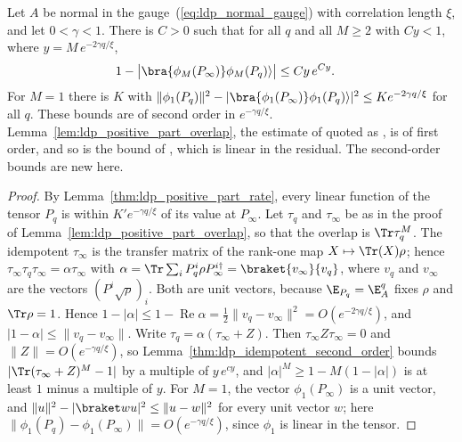 \begin{lemma}
    \label{thm:ldp_positive_part_overlap_second_order}
    \leanok
    Let $A$ be normal in the gauge~(\ref{eq:ldp_normal_gauge}) with correlation
    length $\xi$, and let $0<\gamma<1$. There is $C>0$ such that for all $q$ and
    all $M\ge2$ with $Cy<1$, where $y=M\,e^{-2\gamma q/\xi}$,
    \begin{align}
        1-\bigl\lvert\bra{\phi_M(P_\infty)}\phi_M(P_q)\rangle\bigr\rvert
         & \le Cy\,e^{Cy}.
        \notag
    \end{align}
    For $M=1$ there is $K$ with
    $\lVert\phi_1(P_q)\rVert^2
        -\lvert\bra{\phi_1(P_\infty)}\phi_1(P_q)\rangle\rvert^2\le Ke^{-2\gamma q/\xi}$
    for all $q$. These bounds are of second order in $e^{-\gamma q/\xi}$.
    Lemma~\ref{lem:ldp_positive_part_overlap}, the estimate of
    \cite{Piroli2021LOCC} quoted as \cite[eq.~(S9)]{Malz2024Preparation}, is
    of first order, and so is the
    bound of \cite[App.~B4, eq.~(S52)]{Murota2026ExactLogDepth}, which is
    linear in the residual. The second-order bounds are new here.
\end{lemma}
\begin{proof}
    \leanok
    By Lemma~\ref{thm:ldp_positive_part_rate}, every linear function of the
    tensor $P_q$ is within $K'e^{-\gamma q/\xi}$ of its value at $P_\infty$. Let
    $\tau_q$ and $\tau_\infty$ be as in the proof of
    Lemma~\ref{lem:ldp_positive_part_overlap}, so that the overlap is
    $\Tr\tau_q^M$. The idempotent $\tau_\infty$ is the transfer matrix of the
    rank-one map $X\mapsto\Tr(X)\rho$; hence $\tau_\infty\tau_q\tau_\infty
        =\alpha\tau_\infty$ with
    $\alpha=\Tr\sum_iP_q^i\rho P_\infty^{i\dagger}=\braket{v_\infty}{v_q}$, where
    $v_q$ and $v_\infty$ are the vectors $(P^i\sqrt\rho)_i$. Both are unit
    vectors, because $\E_{P_q}=\E_A^q$ fixes $\rho$ and $\Tr\rho=1$. Hence
    $1-\lvert\alpha\rvert\le1-\operatorname{Re}\alpha
        =\tfrac12\lVert v_q-v_\infty\rVert^2=O(e^{-2\gamma q/\xi})$, and
    $\lvert1-\alpha\rvert\le\lVert v_q-v_\infty\rVert$. Write
    $\tau_q=\alpha(\tau_\infty+Z)$. Then $\tau_\infty Z\tau_\infty=0$ and
    $\lVert Z\rVert=O(e^{-\gamma q/\xi})$, so
    Lemma~\ref{thm:ldp_idempotent_second_order} bounds
    $\lvert\Tr(\tau_\infty+Z)^M-1\rvert$ by a multiple of $y\,e^{c y}$, and
    $\lvert\alpha\rvert^M\ge1-M(1-\lvert\alpha\rvert)$ is at least $1$ minus a
    multiple of $y$.
    For $M=1$, the vector $\phi_1(P_\infty)$ is a unit vector, and
    $\lVert u\rVert^2-\lvert\braket wu\rvert^2\le\lVert u-w\rVert^2$ for every
    unit vector $w$; here
    $\lVert\phi_1(P_q)-\phi_1(P_\infty)\rVert=O(e^{-\gamma q/\xi})$, since
    $\phi_1$ is linear in the tensor.
\end{proof}

